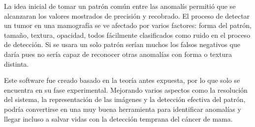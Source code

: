 \par La idea inicial de tomar un patr\'on com\'un entre las anomal\'is permiti\'o que se alcanzaran los valores mostrados de precisi\'on y recobrado. El proceso de detectar un tumor en una mamograf\'ia se ve afectado por varios factores: forma del patr\'on, tama\~no, textura, opacidad, todos f\'acilmente clasificados como ruido en el proceso de detecci\'on. Si se usara un solo patr\'on ser\'ian muchos los falsos negativos que dar\'ia pues no ser\'ia capaz de reconocer otras anomal\'ias con forma o textura distinta.\\

\par Este software fue creado basado en la teor\'ia antes expuesta, por lo que solo se encuentra en su fase experimental. Mejorando varios aspectos como la resoluci\'on del sistema, la representaci\'on de las im\'agenes y la detecci\'on efectiva del patr\'on, podr\'ia convertirse en una muy buena herramienta para identificar anomal\'ias y llegar incluso a salvar vidas con la detecci\'on temprana del c\'ancer de mama.
